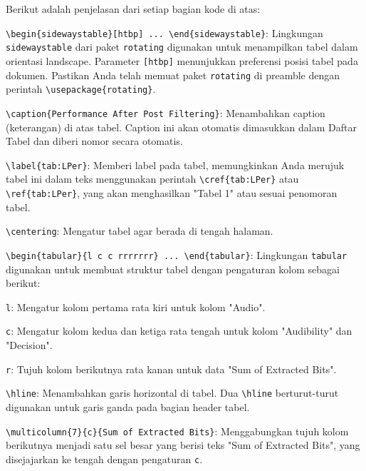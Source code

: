 \noindent Berikut adalah penjelasan dari setiap bagian kode di atas:

\begin{packed_enum}
    \item \texttt{\textbackslash begin\{sidewaystable\}[htbp] ... \textbackslash end\{sidewaystable\}}: Lingkungan \texttt{sidewaystable} dari paket \texttt{rotating} digunakan untuk menampilkan tabel dalam orientasi landscape. Parameter \texttt{[htbp]} menunjukkan preferensi posisi tabel pada dokumen. Pastikan Anda telah memuat paket \texttt{rotating} di preamble dengan perintah \texttt{\textbackslash usepackage\{rotating\}}.
    \item \texttt{\textbackslash caption\{Performance After Post Filtering\}}: Menambahkan caption (keterangan) di atas tabel. Caption ini akan otomatis dimasukkan dalam Daftar Tabel dan diberi nomor secara otomatis.
    \item \texttt{\textbackslash label\{tab:LPer\}}: Memberi label pada tabel, memungkinkan Anda merujuk tabel ini dalam teks menggunakan perintah \texttt{\textbackslash cref\{tab:LPer\}} atau \texttt{\textbackslash ref\{tab:LPer\}}, yang akan menghasilkan "Tabel 1" atau sesuai penomoran tabel.
    \item \texttt{\textbackslash centering}: Mengatur tabel agar berada di tengah halaman.
    \item \texttt{\textbackslash begin\{tabular\}\{l c c rrrrrrr\} ... \textbackslash end\{tabular\}}: Lingkungan \texttt{tabular} digunakan untuk membuat struktur tabel dengan pengaturan kolom sebagai berikut:
        \begin{packed_enum}
            \item \texttt{l}: Mengatur kolom pertama rata kiri untuk kolom "Audio".
            \item \texttt{c}: Mengatur kolom kedua dan ketiga rata tengah untuk kolom "Audibility" dan "Decision".
            \item \texttt{r}: Tujuh kolom berikutnya rata kanan untuk data "Sum of Extracted Bits".
        \end{packed_enum}
    \item \texttt{\textbackslash hline}: Menambahkan garis horizontal di tabel. Dua \texttt{\textbackslash hline} berturut-turut digunakan untuk garis ganda pada bagian header tabel.
    \item \texttt{\textbackslash multicolumn\{7\}\{c\}\{Sum of Extracted Bits\}}: Menggabungkan tujuh kolom berikutnya menjadi satu sel besar yang berisi teks "Sum of Extracted Bits", yang disejajarkan ke tengah dengan pengaturan \texttt{c}.

\end{packed_enum}
